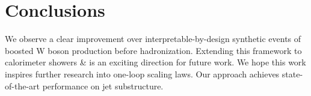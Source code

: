 \section{Conclusions}\label{sec:conclusions}

We observe a clear improvement over interpretable-by-design synthetic
events of boosted W boson production before hadronization. Extending
this framework to calorimeter showers & is an exciting direction for
future work. We hope this work inspires further research into one-loop
scaling laws. Our approach achieves state-of-the-art performance on jet
substructure.


